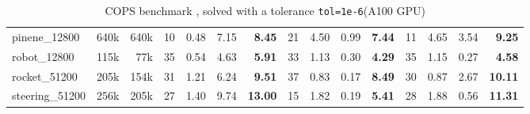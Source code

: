 \begin{table}[!ht]
{\begin{tabular}{|l|rr|rrr >{\bfseries}r|rrr >{\bfseries}r|rrr >{\bfseries}r|}
      pinene\_12800 & 640k & 640k & 10 & 0.48 & 7.15 & 8.45 & 21 & 4.50 & 0.99 & 7.44 & 11 & 4.65 & 3.54 & 9.25 \\
      robot\_12800 & 115k & 77k & 35 & 0.54 & 4.63 & 5.91 & 33 & 1.13 & 0.30 & 4.29 & 35 & 1.15 & 0.27 & 4.58 \\
      rocket\_51200 & 205k & 154k & 31 & 1.21 & 6.24 & 9.51 & 37 & 0.83 & 0.17 & 8.49 & 30 & 0.87 & 2.67 & 10.11 \\
      steering\_51200 & 256k & 205k & 27 & 1.40 & 9.74 & 13.00 & 15 & 1.82 & 0.19 & 5.41 & 28 & 1.88 & 0.56 & 11.31 \\
      \hline
    \end{tabular}
  }
  \caption{COPS benchmark , solved with a tolerance {\tt tol=1e-6}\label{tab:cops:benchmark} (A100 GPU)}
\end{table}


